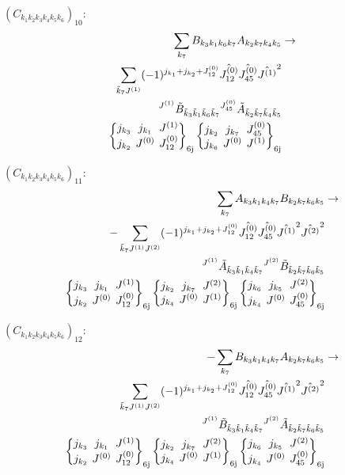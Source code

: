 \documentclass[11pt]{article}
\newcommand{\sixj}[6]{\begingroup\setlength{\arraycolsep}{0.2em}\begin{Bmatrix} #1 & #2 & #3 \\ #4 & #5 & #6 \end{Bmatrix}_{\text{6j}}\endgroup}
\begin{document}
$\left({C}_{{k}_{1}{k}_{2}{k}_{3}{k}_{4}{k}_{5}{k}_{6}}\right)_{10}$:
\begin{align}
\sum_{{k}_{7}}{B}_{{k}_{3}{k}_{1}{k}_{6}{k}_{7}}{A}_{{k}_{2}{k}_{7}{k}_{4}{k}_{5}}&\rightarrow \notag \\\sum_{\tilde{k}_{7}J^{(1)}}(-1)^{j_{{k}_{1}} +j_{{k}_{2}} +J^{(0)}_{12} }\hat{J^{(0)}_{12}}\hat{J^{(0)}_{45}}\hat{J^{(1)}}^{2}& \notag \\{}^{J^{(1)}}\tilde{B}_{\tilde{k}_{3}\tilde{k}_{1}\tilde{k}_{6}\tilde{k}_{7}}{}^{J^{(0)}_{45}}\tilde{A}_{\tilde{k}_{2}\tilde{k}_{7}\tilde{k}_{4}\tilde{k}_{5}}& \notag \\\sixj{j_{{k}_{3}}}{j_{{k}_{1}}}{J^{(1)}}{j_{{k}_{2}}}{J^{(0)}}{J^{(0)}_{12}}\sixj{j_{{k}_{2}}}{j_{{k}_{7}}}{J^{(0)}_{45}}{j_{{k}_{6}}}{J^{(0)}}{J^{(1)}}
\end{align}

$\left({C}_{{k}_{1}{k}_{2}{k}_{3}{k}_{4}{k}_{5}{k}_{6}}\right)_{11}$:
\begin{align}
\sum_{{k}_{7}}{A}_{{k}_{3}{k}_{1}{k}_{4}{k}_{7}}{B}_{{k}_{2}{k}_{7}{k}_{6}{k}_{5}}&\rightarrow \notag \\-\sum_{\tilde{k}_{7}J^{(1)}J^{(2)}}(-1)^{j_{{k}_{1}} +j_{{k}_{2}} +J^{(0)}_{12} }\hat{J^{(0)}_{12}}\hat{J^{(0)}_{45}}\hat{J^{(1)}}^{2}\hat{J^{(2)}}^{2}& \notag \\{}^{J^{(1)}}\tilde{A}_{\tilde{k}_{3}\tilde{k}_{1}\tilde{k}_{4}\tilde{k}_{7}}{}^{J^{(2)}}\tilde{B}_{\tilde{k}_{2}\tilde{k}_{7}\tilde{k}_{6}\tilde{k}_{5}}& \notag \\\sixj{j_{{k}_{3}}}{j_{{k}_{1}}}{J^{(1)}}{j_{{k}_{2}}}{J^{(0)}}{J^{(0)}_{12}}\sixj{j_{{k}_{2}}}{j_{{k}_{7}}}{J^{(2)}}{j_{{k}_{4}}}{J^{(0)}}{J^{(1)}}\sixj{j_{{k}_{6}}}{j_{{k}_{5}}}{J^{(2)}}{j_{{k}_{4}}}{J^{(0)}}{J^{(0)}_{45}}
\end{align}

$\left({C}_{{k}_{1}{k}_{2}{k}_{3}{k}_{4}{k}_{5}{k}_{6}}\right)_{12}$:
\begin{align}
-\sum_{{k}_{7}}{B}_{{k}_{3}{k}_{1}{k}_{4}{k}_{7}}{A}_{{k}_{2}{k}_{7}{k}_{6}{k}_{5}}&\rightarrow \notag \\\sum_{\tilde{k}_{7}J^{(1)}J^{(2)}}(-1)^{j_{{k}_{1}} +j_{{k}_{2}} +J^{(0)}_{12} }\hat{J^{(0)}_{12}}\hat{J^{(0)}_{45}}\hat{J^{(1)}}^{2}\hat{J^{(2)}}^{2}& \notag \\{}^{J^{(1)}}\tilde{B}_{\tilde{k}_{3}\tilde{k}_{1}\tilde{k}_{4}\tilde{k}_{7}}{}^{J^{(2)}}\tilde{A}_{\tilde{k}_{2}\tilde{k}_{7}\tilde{k}_{6}\tilde{k}_{5}}& \notag \\\sixj{j_{{k}_{3}}}{j_{{k}_{1}}}{J^{(1)}}{j_{{k}_{2}}}{J^{(0)}}{J^{(0)}_{12}}\sixj{j_{{k}_{2}}}{j_{{k}_{7}}}{J^{(2)}}{j_{{k}_{4}}}{J^{(0)}}{J^{(1)}}\sixj{j_{{k}_{6}}}{j_{{k}_{5}}}{J^{(2)}}{j_{{k}_{4}}}{J^{(0)}}{J^{(0)}_{45}}
\end{align}
\end{document}
